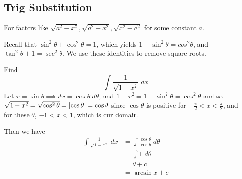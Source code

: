 \documentclass{article}
\begin{document}
  \subsection{Trig Substitution}
  \begin{cthm}
    For factors like $\sqrt{a^2 - x^2}, \sqrt{a^2 + x^2}, \sqrt{x^2 - a^2}$ for some constant $a$.

    Recall that $\sin^2 \theta + \cos^2 \theta = 1$, which yields $1 - \sin^2 \theta = cos^2 \theta$, and $\tan^2 \theta + 1 = \sec^2 \theta$. We use these identities to remove square roots.
  \end{cthm}
  \begin{example}
    Find \[
      \int \frac{1}{\sqrt{1-x^2}} \; dx
    \]
    Let $x = \sin \theta \implies dx = \cos \theta \; d\theta$, and $1 - x^2 = 1-\sin^2 \theta = \cos^2 \theta$ and so $\sqrt{1 - x^2} = \sqrt{\cos^2 \theta} = \abs{\cos \theta} = \cos \theta$ since $\cos \theta$ is positive for $-\frac{\pi}{2} < x < \frac{\pi}{2}$, and for these $\theta$, $-1 < x < 1$, which is our domain.

    Then we have
    \begin{align*}
      \int \frac{1}{\sqrt{1-x^2}} \; dx &= \int \frac{\cos \theta}{\cos \theta} \; d\theta\\
      &= \int 1 \; d\theta\\
      &= \theta + c\\
      &= \arcsin x + c\\
    \end{align*}
  \end{example}
\end{document}
